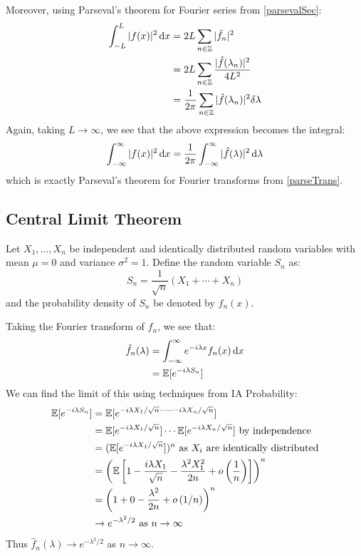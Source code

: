 \documentclass[../main.tex]{subfiles}
\begin{document}
Moreover, using Parseval's theorem for Fourier series from \cref{parsevalSec}:
\begin{align*}
  \int_{-L}^{L} |f(x)|^2 \d{x} &= 2L \sum_{n \in \Z} |\hat{f}_n|^2 \\
                               &= 2L \sum_{n \in \Z} \frac{|\hat{f}(\lambda_n)|^2}{4L^2} \\
                               &= \frac{1}{2\pi} \sum_{n \in \Z} |\hat{f}(\lambda_n)|^2 \delta \lambda
\end{align*}
Again, taking $L \to \infty$, we see that the above expression becomes the integral:
\[
  \int_{-\infty}^{\infty} |f(x)|^2 \d{x} = \frac{1}{2\pi} \int_{-\infty}^{\infty} |\hat{f}(\lambda)|^2 \d{\lambda}
\]
which is exactly Parseval's theorem for Fourier transforms from \cref{parseTrans}.
\subsection{Central Limit Theorem}
Let $X_1, \ldots, X_n$ be independent and identically distributed random variables with mean $\mu = 0$ and variance $\sigma^2 = 1$.
Define the random variable $S_n$ as:
\[
  S_n = \frac{1}{\sqrt{n}} (X_1 + \cdots + X_n)
\]
and the probability density of $S_n$ be denoted by $f_n(x)$.

Taking the Fourier transform of $f_n$, we see that:
\begin{align*}
  \hat{f}_n(\lambda) &= \int_{-\infty}^{\infty} e^{-i \lambda x} f_n(x) \d{x} \\
                     &= \E[e^{-i \lambda S_n}]
\end{align*}
We can find the limit of this using techniques from IA Probability:
\begin{align*}
  \mathbb{E}[e^{-i \lambda S_n}] &= \mathbb{E}[e^{-i \lambda X_1/\sqrt{n} - \cdots - i \lambda X_n/\sqrt{n}}] \\
                         &= \mathbb{E}[e^{-i \lambda X_1/\sqrt{n}}] \cdots \mathbb{E}[e^{-i \lambda X_n/\sqrt{n}}] \text{ by independence} \\
                         &= (\mathbb{E}[e^{-i \lambda X_1/\sqrt{n}}])^{n} \text{ as $X_i$ are identically distributed} \\
                         &= \left(\mathbb{E}\left[1 - \frac{i \lambda X_1}{\sqrt{n}} - \frac{\lambda^2 X^2_1}{2n} + o\left(\frac{1}{n}\right)\right]\right)^{n} \\
                         &= \left(1 + 0 - \frac{\lambda^2}{2n} + o\left(1/n\right)\right)^{n} \\
                         &\to e^{-\lambda^2/2} \text{ as $n \to \infty$}
\end{align*}
Thus $\hat{f}_n(\lambda) \to e^{-\lambda^2/2}$ as $n \to \infty$.
\end{document}
